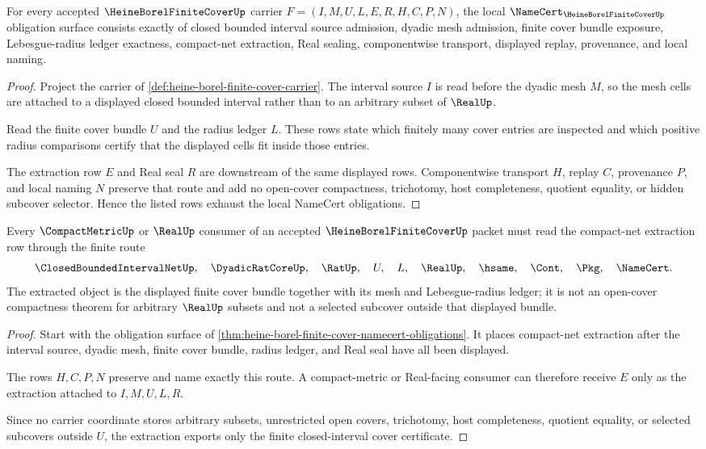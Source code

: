 \begin{theorem}
\label{thm:heine-borel-finite-cover-namecert-obligations}
For every accepted $\HeineBorelFiniteCoverUp$ carrier $F=(I,M,U,L,E,R,H,C,P,N)$, the local $\NameCert_{\HeineBorelFiniteCoverUp}$ obligation surface consists exactly of closed bounded interval source admission, dyadic mesh admission, finite cover bundle exposure, Lebesgue-radius ledger exactness, compact-net extraction, Real sealing, componentwise transport, displayed replay, provenance, and local naming.
\end{theorem}
\begin{proof}
Project the carrier of \autoref{def:heine-borel-finite-cover-carrier}. The interval source $I$ is read before the dyadic mesh $M$, so the mesh cells are attached to a displayed closed bounded interval rather than to an arbitrary subset of $\RealUp$.

Read the finite cover bundle $U$ and the radius ledger $L$. These rows state which finitely many cover entries are inspected and which positive radius comparisons certify that the displayed cells fit inside those entries.

The extraction row $E$ and Real seal $R$ are downstream of the same displayed rows. Componentwise transport $H$, replay $C$, provenance $P$, and local naming $N$ preserve that route and add no open-cover compactness, trichotomy, host completeness, quotient equality, or hidden subcover selector. Hence the listed rows exhaust the local NameCert obligations.
\end{proof}

\begin{theorem}
\label{thm:heine-borel-finite-cover-net-extraction}
Every $\CompactMetricUp$ or $\RealUp$ consumer of an accepted $\HeineBorelFiniteCoverUp$ packet must read the compact-net extraction row through the finite route
$$
\ClosedBoundedIntervalNetUp,\quad
\DyadicRatCoreUp,\quad
\RatUp,\quad
U,\quad
L,\quad
\RealUp,\quad
\hsame,\quad
\Cont,\quad
\Pkg,\quad
\NameCert .
$$
The extracted object is the displayed finite cover bundle together with its mesh and Lebesgue-radius ledger; it is not an open-cover compactness theorem for arbitrary $\RealUp$ subsets and not a selected subcover outside that displayed bundle.
\end{theorem}
\begin{proof}
Start with the obligation surface of \autoref{thm:heine-borel-finite-cover-namecert-obligations}. It places compact-net extraction after the interval source, dyadic mesh, finite cover bundle, radius ledger, and Real seal have all been displayed.

The rows $H,C,P,N$ preserve and name exactly this route. A compact-metric or Real-facing consumer can therefore receive $E$ only as the extraction attached to $I,M,U,L,R$.

Since no carrier coordinate stores arbitrary subsets, unrestricted open covers, trichotomy, host completeness, quotient equality, or selected subcovers outside $U$, the extraction exports only the finite closed-interval cover certificate.
\end{proof}

